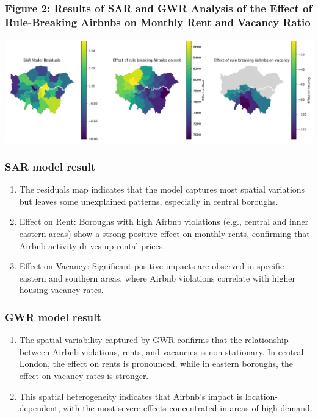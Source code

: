 \documentclass[
  a4paper,
  DIV=11,
  numbers=noendperiod]{scrartcl}
\providecommand{\tightlist}{%
  \setlength{\itemsep}{0pt}\setlength{\parskip}{0pt}}\usepackage{longtable,booktabs,array}
\begin{document}
\subsubsection{Figure 2: Results of SAR and GWR Analysis of the Effect
of Rule-Breaking Airbnbs on Monthly Rent and Vacancy
Ratio}\label{figure-2-results-of-sar-and-gwr-analysis-of-the-effect-of-rule-breaking-airbnbs-on-monthly-rent-and-vacancy-ratio}

\includegraphics{plots/Results_of_SAR_and_GWR_model.png}

\subsubsection{SAR model result}\label{sar-model-result}

\begin{enumerate}
\def\labelenumi{\arabic{enumi}.}
\tightlist
\item
  The residuals map indicates that the model captures most spatial
  variations but leaves some unexplained patterns, especially in central
  boroughs.
\item
  Effect on Rent: Boroughs with high Airbnb violations (e.g., central
  and inner eastern areas) show a strong positive effect on monthly
  rents, confirming that Airbnb activity drives up rental prices.
\item
  Effect on Vacancy: Significant positive impacts are observed in
  specific eastern and southern areas, where Airbnb violations correlate
  with higher housing vacancy rates.
\end{enumerate}

\subsubsection{GWR model result}\label{gwr-model-result}

\begin{enumerate}
\def\labelenumi{\arabic{enumi}.}
\tightlist
\item
  The spatial variability captured by GWR confirms that the relationship
  between Airbnb violations, rents, and vacancies is non-stationary. In
  central London, the effect on rents is pronounced, while in eastern
  boroughs, the effect on vacancy rates is stronger.
\item
  This spatial heterogeneity indicates that Airbnb's impact is
  location-dependent, with the most severe effects concentrated in areas
  of high demand.
\end{enumerate}
\end{document}
